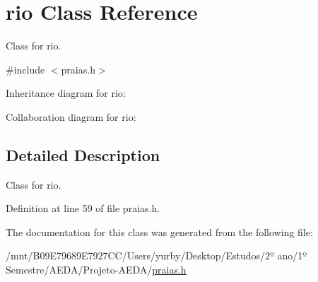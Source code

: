 \hypertarget{classrio}{}\section{rio Class Reference}
\label{classrio}


Class for rio.  




{\ttfamily \#include $<$praias.\+h$>$}



Inheritance diagram for rio\+:


Collaboration diagram for rio\+:


\subsection{Detailed Description}
Class for rio. 

Definition at line 59 of file praias.\+h.



The documentation for this class was generated from the following file\+:\begin{DoxyCompactItemize}
\item 
/mnt/\+B09\+E79689\+E7927\+C\+C/\+Users/yurby/\+Desktop/\+Estudos/2º ano/1º Semestre/\+A\+E\+D\+A/\+Projeto-\/\+A\+E\+D\+A/\hyperlink{praias_8h}{praias.\+h}\end{DoxyCompactItemize}
